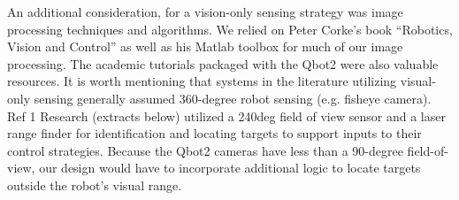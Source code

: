 An additional consideration, for a vision-only sensing strategy was image processing techniques and algorithms.  We relied on Peter Corke’s book “Robotics, Vision and Control” as well as his Matlab toolbox for much of our image processing.  The academic tutorials packaged with the Qbot2 were also valuable resources.  It is worth mentioning that systems in the literature utilizing visual-only sensing generally assumed 360-degree robot sensing (e.g. fisheye camera). Ref 1 Research (extracts below) utilized a 240deg field of view sensor and a laser range finder for identification and locating targets to support inputs to their control strategies.  Because the Qbot2 cameras have less than a 90-degree field-of-view, our design would have to incorporate additional logic to locate targets outside the robot’s visual range.
